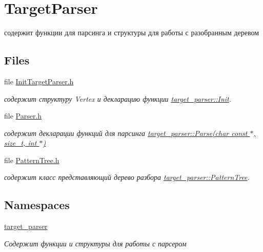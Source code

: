 \hypertarget{group__TargetParser}{}\section{Target\+Parser}
\label{group__TargetParser}


содержит функции для парсинга и структуры для работы с разобранным деревом  


\subsection*{Files}
\begin{DoxyCompactItemize}
\item 
file \hyperlink{InitTargetParser_8h}{Init\+Target\+Parser.\+h}
\begin{DoxyCompactList}\small\item\em содержит структуру Vertex и декларацию функции \hyperlink{namespacetarget__parser_aabf89c1d99b04bac59515c8616155d94}{target\+\_\+parser\+::\+Init}. \end{DoxyCompactList}\item 
file \hyperlink{Parser_8h}{Parser.\+h}
\begin{DoxyCompactList}\small\item\em содержит декларации функций для парсинга \hyperlink{namespacetarget__parser_a3e0ffa10d4fd38f05986d81c0529fdc1}{target\+\_\+parser\+::\+Parse(char const $\ast$, size\+\_\+t, int $\ast$)} \end{DoxyCompactList}\item 
file \hyperlink{PatternTree_8h}{Pattern\+Tree.\+h}
\begin{DoxyCompactList}\small\item\em содержит класс представляющий дерево разбора \hyperlink{classtarget__parser_1_1PatternTree}{target\+\_\+parser\+::\+Pattern\+Tree}. \end{DoxyCompactList}\end{DoxyCompactItemize}
\subsection*{Namespaces}
\begin{DoxyCompactItemize}
\item 
 \hyperlink{namespacetarget__parser}{target\+\_\+parser}
\begin{DoxyCompactList}\small\item\em Содержит функции и структуры для работы с парсером \end{DoxyCompactList}\end{DoxyCompactItemize}


